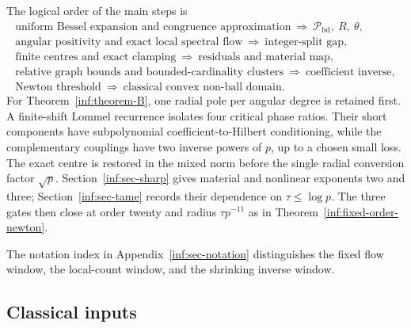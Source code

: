 The logical order of the main steps is
\[
 \begin{gathered}
 \text{uniform Bessel expansion and congruence approximation}
 \ \Longrightarrow\ \mathcal P_{\mathrm{bd}},\ R,\ \theta,\\
 \text{angular positivity and exact local spectral flow}
 \ \Longrightarrow\ \text{integer-split gap},\\
 \text{finite centres and exact clamping}
 \ \Longrightarrow\ \text{residuals and material map},\\
 \text{relative graph bounds and bounded-cardinality clusters}
 \ \Longrightarrow\ \text{coefficient inverse},\\
 \text{Newton threshold}
 \ \Longrightarrow\ \text{classical convex non-ball domain}.
 \end{gathered}
\]
For Theorem~\ref{inf:theorem-B}, one radial pole per angular degree
is retained first. A finite-shift Lommel recurrence isolates four
critical phase ratios. Their short components have subpolynomial
coefficient-to-Hilbert conditioning, while the complementary
couplings have two inverse powers of $p$, up to a chosen small
loss. The exact centre is restored in the mixed norm before the
single radial conversion factor $\sqrt p$.
Section~\ref{inf:sec-sharp} gives material and nonlinear exponents
two and three; Section~\ref{inf:sec-tame} records their dependence
on $\tau\le\log p$. The three gates then close at order twenty
and radius $\tau p^{-11}$ as in
Theorem~\ref{inf:fixed-order-newton}.

The notation index in Appendix~\ref{inf:sec-notation} distinguishes
the fixed flow window, the local-count window, and the shrinking
inverse window.

\subsection{Classical inputs}

